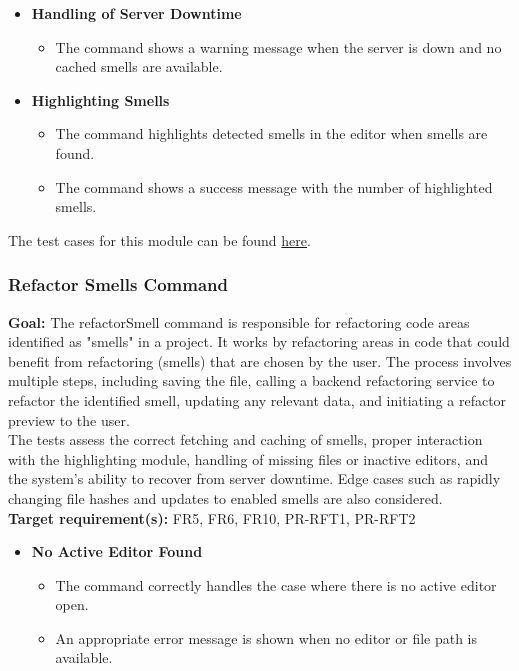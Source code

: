 \documentclass[12pt, titlepage]{article}
\begin{document}
\begin{enumerate}[label={\bf \textcolor{Maroon}{test-SRT-\arabic*}}, wide=0pt, font=\itshape]
\begin{itemize}
    \item \textbf{Handling of Server Downtime}
    \begin{itemize}
        \item The command shows a warning message when the server is down and no cached smells are available.
    \end{itemize}

    \item \textbf{Highlighting Smells}
    \begin{itemize}
        \item The command highlights detected smells in the editor when smells are found.
        \item The command shows a success message with the number of highlighted smells.
    \end{itemize}
\end{itemize}

\noindent The test cases for this module can be found \href{https://github.com/ssm-lab/capstone--sco-vs-code-plugin/blob/plugin-multi-file/test/commands/detectSmells.test.ts}{here}.

\subsubsection{Refactor Smells Command}

\textbf{Goal:} The refactorSmell command is responsible for refactoring code areas identified as "smells" in a project. It works by refactoring areas in code that could benefit from refactoring (smells) that are chosen by the user. The process involves multiple steps, including saving the file, calling a backend refactoring service to refactor the identified smell, updating any relevant data, and initiating a refactor preview to the user.\\

\noindent The tests assess the correct fetching and caching of smells, proper interaction with the highlighting module, handling of missing files or inactive editors, and the system's ability to recover from server downtime. Edge cases such as rapidly changing file hashes and updates to enabled smells are also considered.\\

\noindent\textbf{Target requirement(s):} FR5, FR6, FR10, PR-RFT1, PR-RFT2 ~\cite{SRS} \\

\begin{itemize}
    \item \textbf{No Active Editor Found}
    \begin{itemize}
        \item The command correctly handles the case where there is no active editor open.
        \item An appropriate error message is shown when no editor or file path is available.
    \end{itemize}


\end{itemize}
\end{enumerate}
\end{document}
